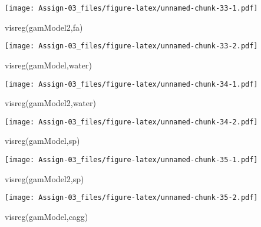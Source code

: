 \documentclass[
]{article}
\newenvironment{Shaded}{\begin{snugshade}}{\end{snugshade}}
\newcommand{\FunctionTok}[1]{\textcolor[rgb]{0.00,0.00,0.00}{#1}}
\newcommand{\NormalTok}[1]{#1}
\newcommand{\StringTok}[1]{\textcolor[rgb]{0.31,0.60,0.02}{#1}}
\begin{document}
\texttt{[image: Assign-03\_files/figure-latex/unnamed-chunk-33-1.pdf]}

\begin{Shaded}
\begin{Highlighting}[]
\FunctionTok{visreg}\NormalTok{(gamModel2,}\StringTok{\textquotesingle{}fa\textquotesingle{}}\NormalTok{)}
\end{Highlighting}
\end{Shaded}

\texttt{[image: Assign-03\_files/figure-latex/unnamed-chunk-33-2.pdf]}

\begin{Shaded}
\begin{Highlighting}[]
\FunctionTok{visreg}\NormalTok{(gamModel,}\StringTok{\textquotesingle{}water\textquotesingle{}}\NormalTok{) }
\end{Highlighting}
\end{Shaded}

\texttt{[image: Assign-03\_files/figure-latex/unnamed-chunk-34-1.pdf]}

\begin{Shaded}
\begin{Highlighting}[]
\FunctionTok{visreg}\NormalTok{(gamModel2,}\StringTok{\textquotesingle{}water\textquotesingle{}}\NormalTok{)}
\end{Highlighting}
\end{Shaded}

\texttt{[image: Assign-03\_files/figure-latex/unnamed-chunk-34-2.pdf]}

\begin{Shaded}
\begin{Highlighting}[]
\FunctionTok{visreg}\NormalTok{(gamModel,}\StringTok{\textquotesingle{}sp\textquotesingle{}}\NormalTok{) }
\end{Highlighting}
\end{Shaded}

\texttt{[image: Assign-03\_files/figure-latex/unnamed-chunk-35-1.pdf]}

\begin{Shaded}
\begin{Highlighting}[]
\FunctionTok{visreg}\NormalTok{(gamModel2,}\StringTok{\textquotesingle{}sp\textquotesingle{}}\NormalTok{)}
\end{Highlighting}
\end{Shaded}

\texttt{[image: Assign-03\_files/figure-latex/unnamed-chunk-35-2.pdf]}

\begin{Shaded}
\begin{Highlighting}[]
\FunctionTok{visreg}\NormalTok{(gamModel,}\StringTok{\textquotesingle{}cagg\textquotesingle{}}\NormalTok{) }
\end{Highlighting}
\end{Shaded}
\end{document}
